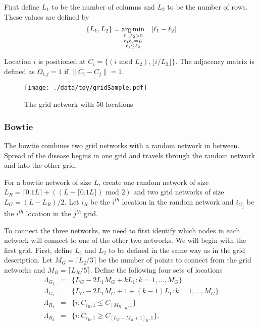 \documentclass[11pt]{article}
\begin{document}
First define $L_1$ to be the number of columns and $L_2$ to be the
number of rows.  These values are defined by
\begin{equation*}
  \lbrace L_1, L_2 \rbrace = \underset{
    \begin{subarray}{c}
      \ell_1,\ell_2 > 0\\
      \ell_1\ell_2 = L\\
      \ell_1 \le \ell_2
    \end{subarray}
  }{\arg\min} \quad |\ell_1 - \ell_2|
\end{equation*}

Location $i$ is positioned at $C_i = \lbrace (i \text{ mod } L_2), \lfloor
i/L_2 \rfloor \rbrace$.  The adjacency matrix is defined as $\Omega_{i,j} =
1$ if $\|C_i - C_j\| = 1$.

\begin{figure}[htb]
\centering
\texttt{[image: ./data/toy/gridSample.pdf]}
\caption{\label{fig:grid50}The grid network with 50 locations}
\end{figure}



\subsubsection{Bowtie}
\label{sec-3-1-5}

The bowtie combines two grid networks with a random network in
between.  Spread of the disease begins in one grid and travels through
the random network and into the other grid.

For a bowtie network of size $L$, create one random network of size
$L_R = \lceil 0.1 L \rceil + ((L - \lceil 0.1 L \rceil) \text{ mod }
2)$ and two grid networks of size $L_G = (L - L_R)/2$.  Let $i_{R}$ be
the $i^{th}$ location in the random network and $i_{G_j}$ be the
$i^{th}$ location in the $j^{th}$ grid.

To connect the three networks, we need to first identify which nodes
in each network will connect to one of the other two networks.  We
will begin with the first grid.  First, define $L_1$ and $L_2$ to be
defined in the same way as in the grid description.  Let $M_{G} =
\lceil L_2/3 \rceil$ be the number of points to connect from the grid
networks and $M_{R} = \lceil L_R/5 \rceil$.  Define the following four
sets of locations
\begin{equation*}
  \begin{array}{rcl}
    \Lambda_{G_1} & = & \lbrace L_G -
                        2L_1M_G + kL_1 : k = 1,\ldots,M_G\rbrace\\
    \Lambda_{G_2} & = & \lbrace L_G -
                        2L_1M_G + 1 + (k-1)L_1 : k =
                        1,\ldots,M_G\rbrace\\
    \Lambda_{R_1} & = & \lbrace i : C_{i_R,1} \le C_{[M_R]_{R},1} \rbrace\\
    \Lambda_{R_2} & = & \lbrace i : C_{i_R,1} \ge C_{[L_R - M_R + 1]_{R},1} \rbrace.
  \end{array}
\end{equation*}
\end{document}

